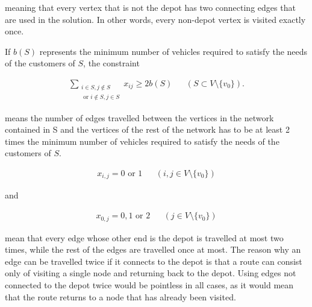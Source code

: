 \noindent
meaning that every vertex that is not the depot has two connecting edges that are used in the solution. In other words, every non-depot vertex is visited exactly once. \cite{laporte2007you}

\medskip
\noindent
If $b(S)$ represents the minimum number of vehicles required to satisfy the needs of the customers of $S$, the constraint

\begin{equation}
\begin{aligned}
\label{eq:baseformula4}
\displaystyle\sum_{\substack{i \in S, j \notin S \\ 
\text{ or } i \notin S, j \in S}} x_{ij} \geq 2b(S) && (S \subset V \setminus\{v_0\}).
\end{aligned}
\end{equation}

\noindent
means the number of edges travelled between the vertices in the network contained in S and the vertices of the rest of the network has to be at least 2 times the minimum number of vehicles required to satisfy the needs of the customers of $S$. \cite{laporte2007you}



\begin{equation}
\begin{aligned}
\label{eq:baseformula5}
x_{i,j} = 0 \text{ or } 1 && (i, j \in V\setminus\{v_0\})
\end{aligned}
\end{equation}

\noindent
and

\begin{equation}
\begin{aligned}
\label{eq:baseformula6}
x_{0,j} = 0, 1 \text{ or } 2 && (j \in V\setminus\{v_0\})
\end{aligned}
\end{equation}

\noindent
mean that every edge whose other end is the depot is travelled at most two times, while the rest of the edges are travelled once at most. The reason why an edge can be travelled twice if it connects to the depot is that a route can consist only of visiting a single node and returning back to the depot. Using edges not connected to the depot twice would be pointless in all cases, as it would mean that the route returns to a node that has already been visited. \cite{laporte2007you}






